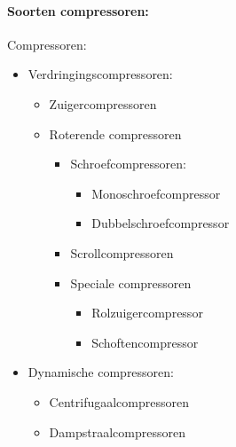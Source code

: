 \documentclass[12pt]{article}
\begin{document}
\paragraph{Soorten compressoren:}
Compressoren:\begin{itemize}
    \item Verdringingscompressoren:\begin{itemize}
        \item Zuigercompressoren
        \item Roterende compressoren\begin{itemize}
            \item Schroefcompressoren:\begin{itemize}
                \item Monoschroefcompressor
                \item Dubbelschroefcompressor
            \end{itemize}
            \item Scrollcompressoren
            \item Speciale compressoren\begin{itemize}
                \item Rolzuigercompressor
                \item Schoftencompressor
            \end{itemize}
        \end{itemize}
    \end{itemize}
    \item Dynamische compressoren:\begin{itemize}
        \item Centrifugaalcompressoren 
        \item Dampstraalcompressoren
    \end{itemize}
\end{itemize}
\end{document}
